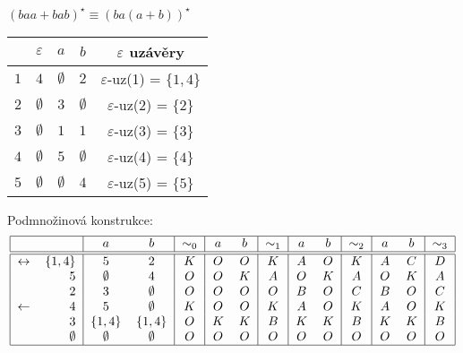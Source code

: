 \begin{multicols}{2}
    $(baa + bab)^\star \equiv (ba(a+b))^\star$


\columnbreak

    \begin{tabular}{|r|c c c|c|}
        \hline
        & $\varepsilon$ & $a$ & $b$ & $\varepsilon$ uzávěry\\
        \hline
        \hline
        $1$ & $4$ & $\emptyset$ & $2$         & $\varepsilon$-uz(1) = $\{1,4\}$\\
        $2$ & $\emptyset$ & $3$ & $\emptyset$ & $\varepsilon$-uz(2) = $\{2\}$\\
        $3$ & $\emptyset$ & $1$ & $1$         & $\varepsilon$-uz(3) = $\{3\}$\\
        $4$ & $\emptyset$ & $5$ & $\emptyset$ & $\varepsilon$-uz(4) = $\{4\}$\\
        $5$ & $\emptyset$ & $\emptyset$ & $4$ & $\varepsilon$-uz(5) = $\{5\}$\\
        \hline
    \end{tabular}
\end{multicols}
Podmnožinová konstrukce:
\[
\begin{tabular}{|r r|c c|c|c c|c|c c|c|c c|c|}
    \hline
    & & $a$ & $b$ & $\sim_0$ & $a$ & $b$ & $\sim_1$ & $a$ & $b$ & $\sim_2$ & $a$ & $b$ & $\sim_3$\\
    \hline
    \hline
    $\leftrightarrow$& $\{1,4\}$ &$5$         &$2$         &$K$ &$O$ &$O$ &$K$ &$A$ &$O$ &$K$ &$A$ &$C$ &$D$\\
    $$&             $5$          &$\emptyset$ &$4$         &$O$ &$O$ &$K$ &$A$ &$O$ &$K$ &$A$ &$O$ &$K$ &$A$\\
    $$&             $2$          &$3$         &$\emptyset$ &$O$ &$O$ &$O$ &$O$ &$B$ &$O$ &$C$ &$B$ &$O$ &$C$\\
    $\leftarrow $&  $4$          &$5$         &$\emptyset$ &$K$ &$O$ &$O$ &$K$ &$A$ &$O$ &$K$ &$A$ &$O$ &$K$\\
    $$&             $3$          &$\{1,4\}$   &$\{1,4\}$   &$O$ &$K$ &$K$ &$B$ &$K$ &$K$ &$B$ &$K$ &$K$ &$B$\\
    $$&             $\emptyset$  &$\emptyset$ &$\emptyset$ &$O$ &$O$ &$O$ &$O$ &$O$ &$O$ &$O$ &$O$ &$O$ &$O$\\
    \hline
\end{tabular}
\]
